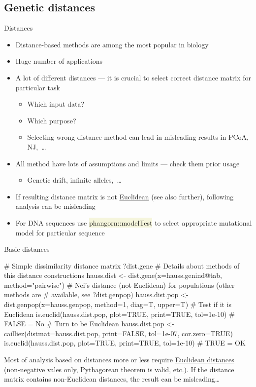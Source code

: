 \documentclass[compress, xelatex, 11pt, xcolor=svgnames, aspectratio=169,
	hyperref={
		bookmarks=true,
		unicode=true,
		colorlinks=true,
		pdftitle={Molecular data in R},
		plainpages=false,
		pdfauthor={Vojtech Zeisek},
		pdfsubject={Course about phylogeny and evolution in R},
		pdfcreator={XeLaTeX},
		pdfkeywords={R, evolution, phylogeny, molecular data},
		linkcolor=Crimson, %
		anchorcolor=Magenta, %
		citecolor=Magenta, %
		filecolor=Magenta, %
		menucolor=Magenta, %
		urlcolor=DodgerBlue, %
		},
	url={hyphens, lowtilde} %
	]{beamer}
\renewcommand{\texttt}[1]{\colorbox{Beige}{{\ttfamily #1}}}
\begin{document}
\subsection{Genetic distances}

\begin{frame}[fragile]{Distances}
	\label{distances}
	\begin{itemize}
		\item Distance-based methods are among the most popular in biology
		\item Huge number of applications
		\item A lot of different distances --- it is crucial to select correct distance matrix for particular task
		\begin{itemize}
			\item Which input data?
			\item Which purpose?
			\item Selecting wrong distance method can lead in misleading results in PCoA, NJ,~\ldots
		\end{itemize}
		\item All method have lots of assumptions and limits --- check them prior usage
		\begin{itemize}
			\item Genetic drift, infinite alleles,~\ldots
		\end{itemize}
		\item If resulting distance matrix is not \href{https://en.wikipedia.org/wiki/Euclidean_distance_matrix}{Euclidean} (see also further), following analysis can be misleading
		\item For DNA sequences use \texttt{phangorn::modelTest} to select appropriate mutational model for particular sequence
	\end{itemize}
\end{frame}

\begin{frame}[fragile]{Basic distances}
	\begin{spluscode}
    # Simple dissimilarity distance matrix
    ?dist.gene # Details about methods of this distance constructions
    hauss.dist <- dist.gene(x=hauss.genind@tab, method="pairwise")
    # Nei's distance (not Euclidean) for populations (other methods are
    # available, see ?dist.genpop)
    hauss.dist.pop <- dist.genpop(x=hauss.genpop, method=1, diag=T, upper=T)
    # Test if it is Euclidean
    is.euclid(hauss.dist.pop, plot=TRUE, print=TRUE, tol=1e-10) # FALSE = No
    # Turn to be Euclidean
    hauss.dist.pop <- cailliez(distmat=hauss.dist.pop, print=FALSE, tol=1e-07,
      cor.zero=TRUE)
    is.euclid(hauss.dist.pop, plot=TRUE, print=TRUE, tol=1e-10) # TRUE = OK
	\end{spluscode}
	\vfil
	Most of analysis based on distances more or less require \href{https://en.wikipedia.org/wiki/Euclidean_distance_matrix}{Euclidean distances} (non-negative vales only, Pythagorean theorem is valid, etc.). If the distance matrix contains non-Euclidean distances, the result can be misleading\ldots
	\vfill
\end{frame}
\end{document}
